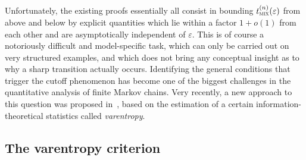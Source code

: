 \documentclass[10pt]{amsart}
\theoremstyle{definition}\newtheorem{defi}[theo]{Definition}\newtheorem{rema}[theo]{Remark}\newtheorem{exam}[theo]{Example}\newtheorem{exem}[theo]{Example}\newtheorem{nota}[theo]{Notation}
\newcommand{\tmix}{t_{\textsc{mix}}}
\begin{document}
Unfortunately, the existing proofs essentially all consist in bounding $\tmix^{(n)}(\varepsilon)$ from above and below by explicit quantities which lie within a factor $1+o(1)$ from each other and are asymptotically independent of $\varepsilon$. This is of course a notoriously difficult and model-specific task, which can only be carried out on very structured examples, and which does not bring any conceptual insight as to why a sharp transition actually occurs. Identifying the general conditions that trigger the cutoff phenomenon has become one of the biggest challenges in the quantitative analysis of finite Markov chains. Very recently, a new approach to this question was proposed in~\cite{arxiv.2102.05597}, based on the estimation of a certain information-theoretical statistics called
\emph{varentropy}.



\subsection{The varentropy criterion}
\end{document}
